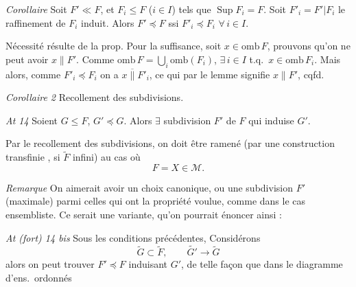 \documentclass[11pt,a4paper]{article}
\begin{document}
\emph{Corollaire} Soit $F' \ll F$, et $F_i \leq F$ ($i \in I$) tels que $\operatorname{Sup} F_i = F$. Soit $F'_i = F' | F_i$ le raffinement de $F_i$ induit. Alors $F' \preccurlyeq F$ ssi $F'_i \preccurlyeq F_i$ $\forall\, i \in I$.

Nécessité résulte de la prop. Pour la suffisance, soit $x \in \mathrm{omb}\, F$, prouvons qu'on ne peut avoir $x \parallel F'$. Comme $\mathrm{omb}\, F = \bigcup_i \mathrm{omb}(F_i)$, $\exists\, i \in I$ t.q.\ $x \in \mathrm{omb}\, F_i$. Mais alors, comme $F'_i \preccurlyeq F_i$ on a $x \mathrel{\overline{\parallel}} F'_i$, ce qui par le lemme signifie $x \parallel F'$, cqfd.

\emph{Corollaire 2} Recollement des subdivisions.

\emph{At 14} Soient $G \leq F$, $G' \preccurlyeq G$. Alors $\exists$ subdivision $F'$ de $F$ qui induise $G'$.


Par le recollement des subdivisions, on doit être ramené (par une construction transfinie \ill{}, si $\widetilde{F}$ infini) au cas où
\[
  F = X \in \mathcal{M} .
\]

\emph{Remarque} On aimerait avoir un choix canonique, ou une subdivision $F'$  \struck{\ill{}} (maximale) parmi celles qui ont la propriété voulue, comme dans le cas ensembliste. Ce serait une variante, qu'on pourrait énoncer ainsi :

\emph{At \struck{\ill{}} (fort) 14 bis} Sous les conditions précédentes,  Considérons 
\[
  \widetilde{G} \subset \widetilde{F}, \qquad \widetilde{G'} \longrightarrow \widetilde{G}
\]
alors on peut trouver $F' \preccurlyeq F$ induisant $G'$, de telle façon que dans le diagramme d'ens.\ ordonnés

\end{document}
